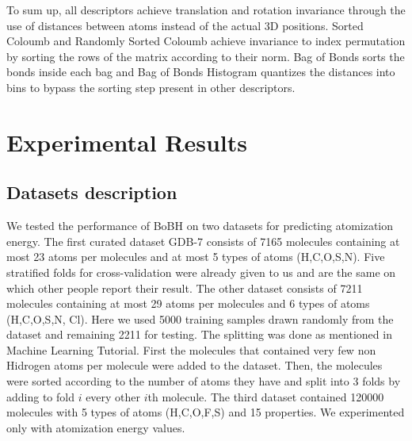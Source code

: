 \documentclass{article}
\begin{document}
To sum up, all descriptors achieve translation and rotation invariance through the use of
distances between atoms instead of the actual 3D positions. Sorted Coloumb and Randomly Sorted Coloumb achieve invariance to index permutation by sorting the rows of the matrix according to their norm. Bag of Bonds sorts the bonds inside each bag and Bag of Bonds Histogram quantizes the distances into bins to bypass the sorting step present in other descriptors.



\section{Experimental Results}

\subsection{Datasets description}
We tested the performance of BoBH on two datasets for predicting atomization energy.
The first curated dataset GDB-7 consists of 7165 molecules containing at most 23 atoms per molecules and at most 5 types of atoms (H,C,O,S,N). Five stratified folds for cross-validation were already given to us and are the same on which other people report their result.
The other dataset consists of 7211 molecules containing at most 29 atoms per molecules and 6 types of atoms (H,C,O,S,N, Cl). Here we used 5000 training samples drawn randomly from the dataset and remaining 2211 for testing. The splitting was done as mentioned in Machine Learning Tutorial. First the molecules that contained very few non Hidrogen atoms per molecule were added to the dataset. Then, the molecules were sorted according to the number of atoms they have and split into 3 folds by adding to fold $i$ every other $i$th molecule.
The third dataset contained 120000 molecules with 5 types of atoms (H,C,O,F,S) and 15 properties.
We experimented only with atomization energy values.
\end{document}
